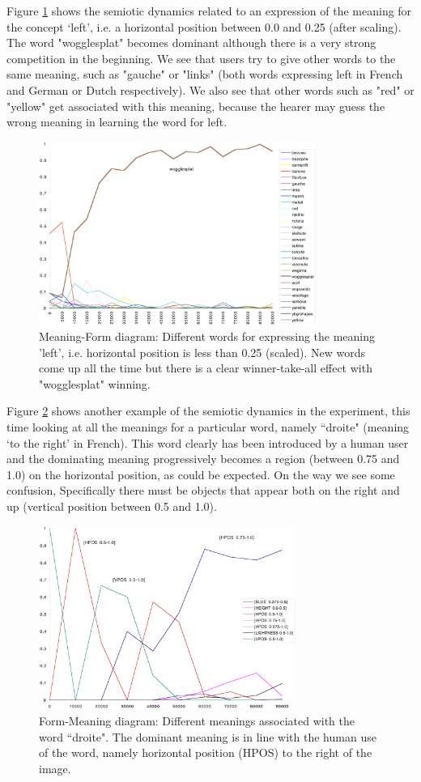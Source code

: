 {Figure \ref{fig:woggle} shows the semiotic dynamics related to an expression of the meaning for the 
concept `left', i.e. a horizontal position 
between 0.0 and 0.25 (after scaling). The word "wogglesplat" becomes dominant
although there is a very strong competition in the beginning. 
We see that users try to give other words to the same meaning, such as "gauche" or "links" (both words expressing left 
in French and German or Dutch respectively). We also see that other words such as "red" or "yellow" get associated with this 
meaning, because the hearer may guess the wrong meaning in learning the word for left. 
\begin{figure}[htbp]
  \centerline{\includegraphics[width=.80\textwidth,height= 6cm]{chap8/figures/wogglesplat}}
\caption{\footnotesize\label{fig:woggle} 
Meaning-Form diagram: Different words for expressing the meaning 'left', i.e. 
horizontal position is less than 0.25 (scaled). 
New words come up all the time but there is a clear winner-take-all effect with "wogglesplat" winning. 
}
\end{figure}

Figure \ref{fig:droite} shows another example of the semiotic dynamics in the experiment, this time looking at all the 
meanings for a particular word, namely ``droite" (meaning `to the right' in French). This word clearly has been introduced
by a human user and the dominating meaning progressively becomes a region (between 0.75 and 1.0) on the horizontal position, 
as could be expected. On the way we see some confusion, Specifically there must be objects that appear both on the right 
and up (vertical position between 0.5 and 1.0). 
\begin{figure}[htbp]
  \centerline{\includegraphics[width=.80\textwidth,height=6cm]{chap8/figures/droite}}
\caption{\footnotesize\label{fig:droite} 
Form-Meaning diagram: Different meanings associated with the word ``droite". The dominant meaning is 
in line with the human use of the word, namely horizontal position (HPOS) to the right of the image.}
\end{figure}

}
